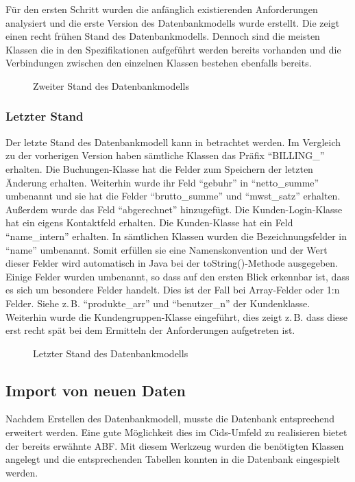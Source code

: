 Für den ersten Schritt wurden die anfänglich existierenden Anforderungen analysiert und die erste Version des Datenbankmodells wurde erstellt. 
Die  zeigt einen recht frühen Stand des Datenbankmodells.
Dennoch sind die meisten Klassen die in den Spezifikationen aufgeführt werden bereits vorhanden und die Verbindungen zwischen den einzelnen Klassen bestehen ebenfalls bereits. 

\begin{sidewaysfigure}
	\centering
	\caption{Zweiter Stand des Datenbankmodells}
	\label{fig:db-two}
\end{sidewaysfigure}

\subsubsection{Letzter Stand}
Der letzte Stand des Datenbankmodell kann in  betrachtet werden.
Im Vergleich zu der vorherigen Version haben sämtliche Klassen das Präfix "`BILLING\_"' erhalten.
Die Buchungen-Klasse hat die Felder zum Speichern der letzten Änderung erhalten.
Weiterhin wurde ihr Feld "`gebuhr"' in "`netto\_summe"' umbenannt und sie hat die Felder "`brutto\_summe"' und "`mwst\_satz"' erhalten. Außerdem wurde das Feld "`abgerechnet"' hinzugefügt.
Die Kunden-Login-Klasse hat ein eigens Kontaktfeld erhalten.
Die Kunden-Klasse hat ein Feld "`name\_intern"' erhalten.
In sämtlichen Klassen wurden die Bezeichnungsfelder in "`name"' umbenannt. Somit erfüllen sie eine Namenskonvention und der Wert dieser Felder wird automatisch in Java bei der toString()-Methode ausgegeben.
Einige Felder wurden umbenannt, so dass auf den ersten Blick erkennbar ist, dass es sich um besondere Felder handelt. Dies ist der Fall bei Array-Felder oder 1:n Felder. Siehe z.\,B. "`produkte\_arr"' und "`benutzer\_n"' der Kundenklasse.
Weiterhin wurde die Kundengruppen-Klasse eingeführt, dies zeigt z.\,B. dass diese erst recht spät bei dem Ermitteln der Anforderungen aufgetreten ist. 
\begin{sidewaysfigure}
	\centering
	\caption{Letzter Stand des Datenbankmodells}
	\label{fig:db-final}
\end{sidewaysfigure}

\subsection{Import von neuen Daten}
Nachdem Erstellen des Datenbankmodell, musste die Datenbank entsprechend erweitert werden.
Eine gute Möglichkeit dies im Cids-Umfeld zu realisieren bietet der bereits erwähnte \ac{ABF}. Mit diesem Werkzeug wurden die benötigten Klassen angelegt und die entsprechenden Tabellen konnten in die Datenbank eingespielt werden.

